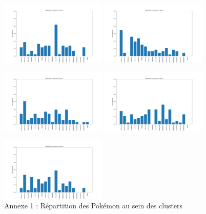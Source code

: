 \documentclass[a4paper,12pt]{article}
\begin{document}
\begin{figure}[!h]
    \includegraphics[width=0.45\textwidth]{Clustering/number_poke_gen/gen5.png}
    \includegraphics[width=0.45\textwidth]{Clustering/number_poke_gen/gen6.png}
    

    \vspace{1em}  %

    \includegraphics[width=0.45\textwidth]{Clustering/number_poke_gen/gen7.png}
    \includegraphics[width=0.45\textwidth]{Clustering/number_poke_gen/gen8.png}
    

    \vspace{1em}  %

    \includegraphics[width=0.45\textwidth]{Clustering/number_poke_gen/gen9.png}
    \caption*{Annexe 1 : Répartition des Pokémon au sein des clusters}
\end{figure}
\end{document}
